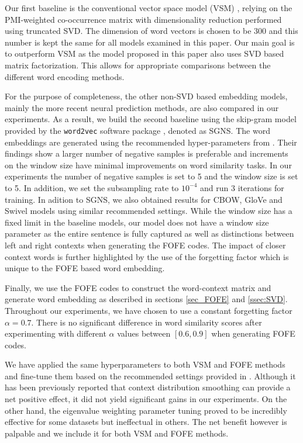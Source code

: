 \documentclass[11pt,letterpaper]{article}
\begin{document}
Our first baseline is the conventional vector space model (VSM) \cite{Turney2010}, relying on the PMI-weighted co-occurrence  matrix with dimensionality reduction performed using truncated SVD. The dimension of word vectors is chosen to be 300 and this number is kept the same for all models examined in this paper. Our main goal is to outperform VSM as the model proposed in this paper also uses SVD based matrix factorization. This allows for appropriate comparisons between the different word encoding methods. 

For the purpose of completeness, the other non-SVD based embedding models, mainly the more recent neural prediction methods, are also compared in our experiments. As a result, 
we build the second baseline using the skip-gram model provided by the {\small\verb|word2vec|} software package \cite{mikolov2013efficient}, denoted as SGNS. The word embeddings are generated using the recommended hyper-parameters from \cite{Levy}. Their findings show a larger number of negative samples is preferable and increments on the window size have minimal improvements on word similarity tasks.
In our experiments the number of negative samples is set to 5 and the window size is set to 5. In addition, we set the subsampling rate to $10^{-4}$ and run 3 iterations for training. In adition to SGNS, we also obtained results for CBOW, GloVe \cite{pennington} and Swivel \cite{swivel} models using similar recommended settings. While the window size has a fixed limit in the baseline models, our model does not have a window size parameter as the entire sentence is fully captured as well as distinctions between left and right contexts when generating the FOFE codes. The impact of closer context words is further highlighted by the use of the forgetting factor which is unique to the FOFE based word embedding. 

Finally, we use the FOFE codes to construct the word-context matrix and generate word embedding as described in sections \ref{sec_FOFE} and \ref{ssec:SVD}. Throughout our experiments, we have chosen to use a constant forgetting factor $\alpha=0.7$. There is no significant difference in word similarity scores after experimenting with different $\alpha$ values between $[0.6, 0.9]$ when generating FOFE codes.

We have applied the same hyperparameters to both VSM and FOFE methods and fine-tune them based on the recommended settings provided in \cite{Levy}. Although it has been previously reported that context distribution smoothing \cite{mikolov2013distributed} can provide a net positive effect, it did not yield significant gains in our experiments. On the other hand, the eigenvalue weighting parameter tuning \cite{caron2001experiments} proved to be incredibly effective for some datasets but ineffectual in others. The net benefit however is palpable and we include it for both VSM and FOFE methods. 
\end{document}
